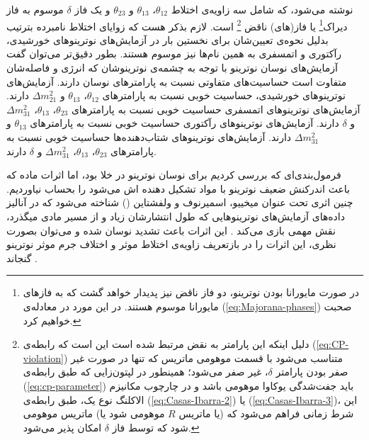 \documentclass[a4paper]{book}
\begin{document}
نوشته می‌شود، که شامل سه زاویه‌ی اختلاط {\footnotesize$\theta_{12}$}، {\footnotesize$\theta_{13}$} و {\footnotesize$\theta_{23}$} و یک فاز {\footnotesize$\delta$} موسوم به فاز دیراک\footnote{در صورت مایورانا بودن نوترینو، دو فاز ناقض  نیز پدیدار خواهد گشت که به فاز‌های مایورانا موسوم هستند. در این مورد در معادله‌ی (\ref{eq:Majorana-phases}) صحبت خواهیم کرد.} یا فاز(های) ناقض \footnote{دلیل اینکه این پارامتر به نقض  مرتبط شده است این است که رابطه‌ی (\ref{eq:CP-violation}) متناسب می‌شود با قسمت موهومی ماتریس  که تنها در صورت غیر صفر بودن پارامتر {\footnotesize$\delta$}، غیر صفر می‌شود؛ همینطور در لپتون‌زایی که طبق رابطه‌ی (\ref{eq:cp-parameter}) باید جفت‌شدگی یوکاوا موهومی باشد و در چارچوب مکانیزم الاکلنگ نوع یک، طبق رابطه‌ی (\ref{eq:Casas-Ibarra-2}) یا (\ref{eq:Casas-Ibarra-3})، این شرط زمانی فراهم می‌شود که (یا ماتریس {\footnotesize$R$} موهومی شود یا) ماتریس  موهومی شود که توسط فاز‌ {\footnotesize$\delta$} امکان پذیر می‌شود.} است. لازم بذکر هست که زوایای اختلاط نامبرده بترتیب بدلیل نحوه‌ی تعیین‌شان برای نخستین بار در آزمایش‌های نوترینوهای خورشیدی، رآکتوری و اتمسفری به همین نام‌ها نیز موسوم هستند. 
بطور دقیق‌تر می‌توان گفت آزمایش‌های نوسان نوترینو با توجه به چشمه‌ی نوترینوشان که انرژی و فاصله‌شان متفاوت است حساسیت‌های متفاوتی نسبت به پارامتر‌های نوسان دارند. آزمایش‌های نوترینوهای خورشیدی، حساسیت خوبی نسبت به پارامتر‌های {\footnotesize$\theta_{12}$}، {\footnotesize$\theta_{13}$} و {\footnotesize$\Delta m^2_{21}$} دارند. آزمایش‌های نوترینوهای اتمسفری حساسیت خوبی نسبت به پارامترهای {\footnotesize$\theta_{23}$}، {\footnotesize$\theta_{13}$}، {\footnotesize$\Delta m^2_{31}$} و {\footnotesize$\delta$} دارند. آزمایش‌های نوترینوهای رآکتوری حساسیت خوبی نسبت به پارامترهای {\footnotesize$\theta_{13}$} و {\footnotesize$\Delta m^2_{31}$} دارند. آزمایش‌های نوترینوهای شتاب‌دهنده‌ها حساسیت خوبی نسبت به پارامتر‌های {\footnotesize$\theta_{23}$}، {\footnotesize$\theta_{13}$}، {\footnotesize$\Delta m^2_{31}$} و {\footnotesize$\delta$} دارند.

فرمول‌بندی‌ای که بررسی کردیم برای نوسان نوترینو در خلا بود، اما اثرات ماده که باعث اندرکنش ضعیف نوترینو با مواد تشکیل دهنده اش می‌شود را بحساب نیاوردیم. چنین اثری تحت عنوان میخییو، اسمیرنوف و ولفشتاین () شناخته می‌شود که در آنالیز داده‌های آزمایش‌های نوترینوهایی که طول انتشارشان زیاد و از مسیر مادی میگذرد، نقش مهمی بازی می‌کند \cite{Mikheyev:1985zog,Wolfenstein:1977ue}. این اثرات باعث تشدید نوسان شده و می‌توان بصورت نظری،‌ این اثرات را در بازتعریف زاویه‌ی اختلاط موثر و اختلاف جرم موثر نوترینو گنجاند \cite{Giunti:2007ry}.
\end{document}
